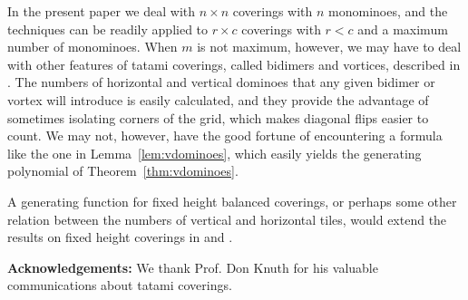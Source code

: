 \documentclass[12pt]{amsart}
\newcommand{\lref}[1]{Lemma~\ref{lem:#1}}
\newcommand{\tref}[1]{Theorem~\ref{thm:#1}}
\newcommand\flr[2]{\left\lfloor \frac{#1}{#2} \right\rfloor}
\begin{document}
In the present paper we deal with $n\times n$ coverings with $n$
monominoes, and the techniques can be readily applied to $r\times c$
coverings with $r<c$ and a maximum number of monominoes.  When $m$ is
not maximum, however, we may have to deal with other features of
tatami coverings, called bidimers and vortices, described in
\cite{EricksonRuskeySchurch2011}.  The numbers of horizontal and
vertical dominoes that any given bidimer or vortex will introduce is
easily calculated, and they provide the advantage of sometimes
isolating corners of the grid, which makes diagonal flips easier to
count.  We may not, however, have the good fortune of encountering a
formula like the one in \lref{vdominoes}, which easily yields the
generating polynomial of \tref{vdominoes}.

A generating function for fixed height balanced coverings, or perhaps
some other relation between the numbers of vertical and horizontal
tiles, would extend the results on fixed height coverings in
\cite{RuskeyWoodcock2009} and \cite{EricksonRuskeySchurch2011}.



\textbf{Acknowledgements:} We thank Prof. Don Knuth for his valuable
communications about tatami coverings.






\end{document}
